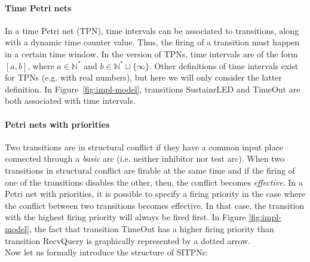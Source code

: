 \documentclass[pdflatex,sn-mathphys]{sn-jnl}%
\theoremstyle{thmstyleone}%
\theoremstyle{thmstyletwo}%
\theoremstyle{thmstylethree}%
\begin{document}
\paragraph{Time Petri nets}

In a time Petri net (TPN), time intervals can be associated to
transitions, along with a dynamic time counter value. Thus, the firing
of a transition must happen in a certain time window. In the
\hilecop{} version of TPNs, time intervals are of the form $[a, b]$,
where $a\in\mathbb{N}^{*}$ and
$b\in\mathbb{N}^{*}\sqcup\{\infty\}$. Other definitions of time
intervals exist for TPNs (e.g. with real numbers), but here we will
only consider the latter definition. In Figure~\ref{fig:impl-model},
transitions SustainrLED and TimeOut are both associated with time
intervals.

\paragraph{Petri nets with priorities}

Two transitions are in structural conflict if they have a common input
place connected through a \textit{basic} arc (i.e. neither inhibitor
nor test arc). When two transitions in structural conflict are firable
at the same time and if the firing of one of the transitions disables
the other, then, the conflict becomes \textit{effective}. In a Petri
net with priorities, it is possible to specify a firing priority in
the case where the conflict between two transitions becomes
effective. In that case, the transition with the highest firing
priority will always be fired first. In Figure \ref{fig:impl-model},
the fact that transition TimeOut has a higher firing priority than
transition RecvQuery is graphically represented by a dotted arrow. \\

\noindent{}Now let us formally introduce the structure of SITPNs:
\end{document}
